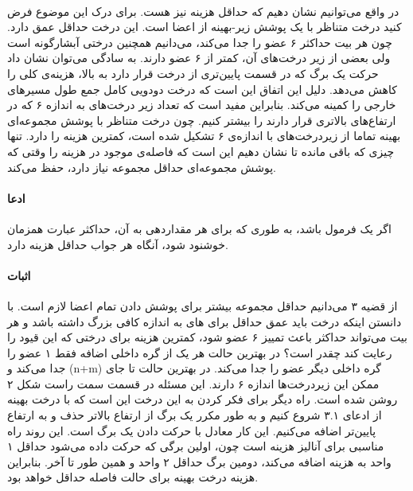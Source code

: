 \documentclass[a4paper]{article}
\begin{document}
	\paragraph{}
	در واقع می‌توانیم نشان دهیم که
	حداقل هزینه نیز هست. برای درک این موضوع فرض کنید درخت
	متناظر با یک پوشش زیر-بهینه 
	از اعضا است. این درخت حداقل عمق 
	دارد. چون هر بیت حداکثر ۶ عضو را جدا می‌کند، می‌دانیم 
	همچنین درختی آبشارگونه است ولی بعضی از زیر درخت‌‌های آن، کمتر از ۶ عضو دارند. به سادگی می‌توان نشان داد حرکت
	یک برگ که در قسمت پایین‌تری از درخت قرار دارد به بالا، هزینه‌ی کلی را کاهش می‌دهد. دلیل این اتفاق این است که
	درخت دودویی کامل جمع طول مسیرهای خارجی را کمینه می‌کند. بنابراین مفید است که تعداد زیر درخت‌های به اندازه ۶
	که در ارتفاع‌های بالاتری قرار دارند را بیشتر کنیم. چون درخت متناظر با پوشش مجموعه‌ای بهینه تماما از زیردرخت‌های
	با اندازه‌ی ۶ تشکیل شده است، کمترین هزینه را دارد. تنها چیزی که باقی مانده تا نشان دهیم این است که
	فاصله‌ی موجود در هزینه را وقتی که پوشش مجموعه‌ای حداقل
	مجموعه نیاز دارد، حفظ می‌کند.
	\paragraph{ادعا}
	اگر
	\lr{$\phi$}
	یک فرمول
	باشد، به طوری که برای هر مقداردهی به آن، حداکثر
	عبارت همزمان خوشنود شود، آنگاه هر جواب 
	حداقل هزینه
	دارد.
	\paragraph{اثبات}
	از قضیه ۳ می‌دانیم حداقل 
	مجموعه بیشتر برای پوشش دادن تمام اعضا لازم است. با دانستن اینکه درخت باید عمق حداقل
	برای 
	های به اندازه کافی بزرگ داشته باشد و هر بیت می‌تواند حداکثر باعث تمییز ۶ عضو شود، کمترین هزینه برای درختی
	که این قیود را رعایت کند چقدر است؟ در بهترین حالت هر یک از 
	گره داخلی اضافه فقط ۱ عضو را جدا می‌کند و 
	\lr(n+m)
	گره داخلی دیگر 
	عضو را جدا می‌کند. در بهترین حالت تا جای ممکن این زیردرخت‌ها اندازه ۶ دارند. این مسئله در قسمت سمت راست شکل
	۲ روشن شده است. راه دیگر برای فکر کردن به این درخت این است که با درخت بهینه از ادعای ۳.۱ شروع کنیم و به طور
	مکرر یک برگ از ارتفاع بالاتر حذف و به ارتفاع پایین‌تر اضافه می‌کنیم. این کار معادل با حرکت دادن یک برگ است.
	این روند راه مناسبی برای آنالیز هزینه است چون، اولین برگی که حرکت داده می‌شود حداقل ۱ واحد به هزینه اضافه می‌کند، دومین برگ حداقل ۲ واحد و همین طور تا آخر. بنابراین هزینه درخت بهینه برای حالت فاصله 
	حداقل 
	خواهد بود.
\end{document}
